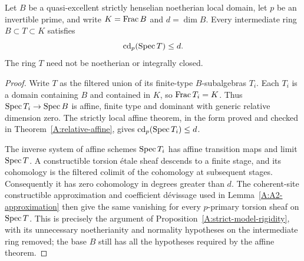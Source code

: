 \begin{lemma}
\label{A:strict-overring-bound}
Let $B$ be a quasi-excellent strictly henselian noetherian local
domain, let $p$ be an invertible prime, and write
$K=\operatorname{Frac} B$ and $d=\dim B$. Every intermediate ring
$B\subset T\subset K$ satisfies
\[
 \operatorname{cd}_p(\operatorname{Spec} T)\leq d.
\]
The ring $T$ need not be noetherian or integrally closed.
\end{lemma}
\begin{proof}
Write $T$ as the filtered union of its finite-type $B$-subalgebras
$T_i$. Each $T_i$ is a domain containing $B$ and contained in $K$,
so $\operatorname{Frac} T_i=K$. Thus $\operatorname{Spec} T_i\to\operatorname{Spec} B$ is affine,
finite type and dominant with generic relative dimension zero.
The strictly local affine theorem, in the form proved and checked
in Theorem~\ref{A:relative-affine}, gives
$\operatorname{cd}_p(\operatorname{Spec} T_i)\leq d$.

The inverse system of affine schemes $\operatorname{Spec} T_i$ has affine
transition maps and limit $\operatorname{Spec} T$. A constructible torsion
\'etale sheaf descends to a finite stage, and its cohomology is
the filtered colimit of the cohomology at subsequent stages.
Consequently it has zero cohomology in degrees greater than $d$.
The coherent-site constructible approximation and coefficient
d\'evissage used in Lemma~\ref{A:A2-approximation} then give the
same vanishing for every $p$-primary torsion sheaf on $\operatorname{Spec} T$.
This is precisely the argument of
Proposition~\ref{A:strict-model-rigidity}, with its unnecessary
noetherianity and normality hypotheses on the intermediate ring
removed; the base $B$ still has all the hypotheses required by
the affine theorem.
\end{proof}

